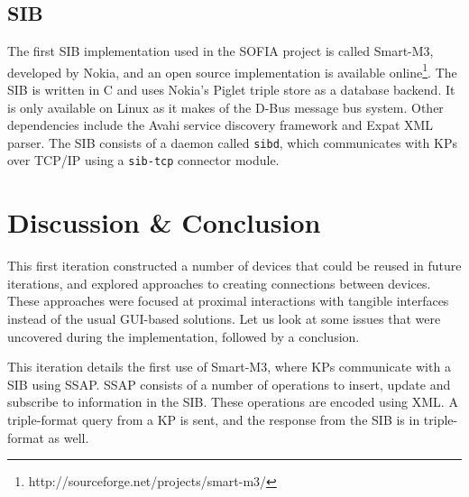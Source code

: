 
\subsection{SIB}

The first \ac{SIB} implementation used in the \ac{SOFIA} project is called Smart-M3, developed by Nokia, and an open source implementation is available online\footnote{http://sourceforge.net/projects/smart-m3/}. The \ac{SIB} is written in C and uses Nokia's Piglet triple store as a database backend. It is only available on Linux as it makes of the D-Bus message bus system. Other dependencies include the Avahi service discovery framework and Expat XML parser.  The \ac{SIB} consists of a daemon called \texttt{sibd}, which communicates with \acp{KP} over TCP/IP using a \texttt{sib-tcp} connector module.  



\section{Discussion \& Conclusion}




This first iteration constructed a number of devices that could be reused in future iterations, and explored approaches to creating connections between devices. These approaches were focused at proximal interactions with tangible interfaces instead of the usual \ac{GUI}-based solutions. Let us look at some issues that were uncovered during the implementation, followed by a conclusion. 

This iteration details the first use of Smart-M3, where \acp{KP} communicate with a \ac{SIB} using \ac{SSAP}\cite{Honkola2010}. \ac{SSAP} consists of a number of operations to insert, update and subscribe to information in the SIB. These operations are encoded using XML. A triple-format query from a \ac{KP} is sent, and the response from the \ac{SIB} is in triple-format as well. %

